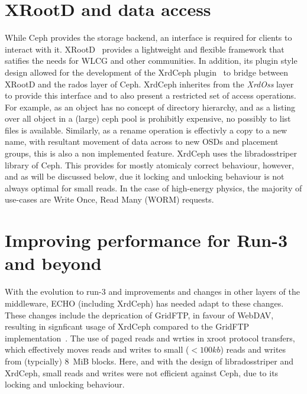 \documentclass{webofc}
\begin{document}
\section{XRootD and data access\label{sec:xrd}}
While Ceph provides the storage backend, an interface is required for clients to interact with it. XRootD~\cite{xrootd} provides a lightweight and flexible framework that satifies the needs for WLCG and other communities. In addition, its plugin style design allowed for the development of the XrdCeph plugin~\cite{libradosstriper} to bridge between XRootD and the rados layer of Ceph. 
XrdCeph inherites from the {\em XrdOss} layer to provide this interface and to also present a restricted set of access operations. For example, as an object has no concept of directory hierarchy, and as a listing over all object in a (large) ceph pool is prohibitly expensive, no possibly to list files is available. Similarly, as a rename operation is effectivly a copy to a new name, with resultant movement of data across to new OSDs and placement groups, this is also a non implemented feature. 
XrdCeph uses the libradosstriper library of Ceph. This provides for mostly atomicaly correct behaviour, however, and as will be discussed below, due it locking and unlocking behaviour is not always optimal for small reads. In the case of high-energy physics, the majority of use-cases are Write Once, Read Many (WORM) requests. 



\section{Improving performance for Run-3 and beyond\label{sec:requirements}}
With the evolution to run-3 and improvements and changes in other layers of the middleware, ECHO (including XrdCeph) has needed adapt to these changes. 
These changes include the deprication of GridFTP, in favour of WebDAV, resulting in signficant usage of XrdCeph compared to the GridFTP implementation~\cite{gridftpplugin,dewhurst2017deployment}. The use of paged reads and wrties in xroot protocol transfers, which effectively moves reads and writes to small ($<100kb$) reads and writes from (typcially) 8~MiB blocks. Here, and with the design of libradosstriper and XrdCeph, small reads and writes were not efficient against Ceph, due to its locking and unlocking behaviour. 
\end{document}
